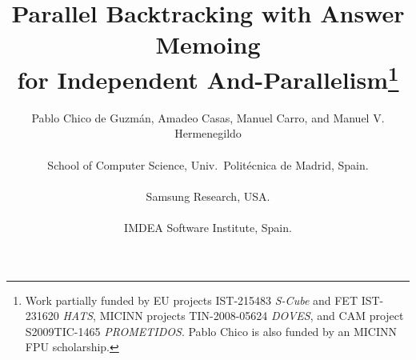 \documentclass{tlp}
\begin{document}
\title[]{\vspace{-1em}Parallel Backtracking with Answer Memoing \\
  for Independent And-Parallelism\thanks{
Work partially funded by
EU projects IST-215483 {\em S-Cube} and 
FET IST-231620 {\em HATS}, 
MICINN projects TIN-2008-05624 {\em DOVES},
and CAM project S2009TIC-1465 {\em PROMETIDOS}. Pablo Chico is also
funded by an MICINN FPU 
scholarship.}}



\author[]
       {Pablo Chico de Guzm\'{a}n, Amadeo Casas, Manuel Carro,
        and Manuel V. Hermenegildo\\ \ \\
 School of Computer Science, Univ.\ Polit\'ecnica de Madrid, Spain.\\
     \\ 
 Samsung Research, USA.\\
     \\ 
 IMDEA Software Institute, Spain.\\
}











\pagerange{\pageref{firstpage}--\pageref{lastpage}}
\setcounter{page}{1}

\maketitle
\end{document}
